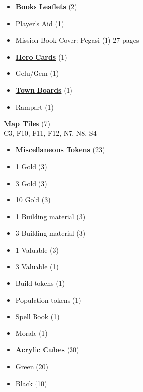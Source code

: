 

\begin{multicols}{3}

\small

\begin{itemize}[leftmargin=0pt, label={}, noitemsep, noitemsep]
  \item \textbf{\underline{Books Leaflets}} (2)
  \item Player's Aid (1)
  \item Mission Book {Cover: Pegasi} (1) 27 pages
\end{itemize}

\begin{itemize}[leftmargin=0pt, label={}, noitemsep, noitemsep]
  \item \textbf{\underline{Hero Cards}} (1)
  \item Gelu/Gem (1)
\end{itemize}

\begin{itemize}[leftmargin=0pt, label={}, noitemsep, noitemsep]
  \item \textbf{\underline{Town Boards}} (1)
  \item Rampart (1)
\end{itemize}

\textbf{\underline{Map Tiles}} (7)\\
C3, F10, F11, F12, N7, N8, S4

\begin{itemize}[leftmargin=0pt, label={}, noitemsep, noitemsep]
  \item \textbf{\underline{Miscellaneous Tokens}} (23)
  \item 1 Gold (3)
  \item 3 Gold (3)
  \item 10 Gold (3)
  \item 1 Building material (3)
  \item 3 Building material (3)
  \item 1 Valuable (3)
  \item 3 Valuable (1)
  \item Build tokens (1)
  \item Population tokens (1)
  \item Spell Book (1)
  \item Morale (1)
\end{itemize}

\begin{itemize}[leftmargin=0pt, label={}, noitemsep, noitemsep]
  \item \textbf{\underline{Acrylic Cubes}} (30)
  \item Green (20)
  \item Black (10)
\end{itemize}


\end{multicols}
